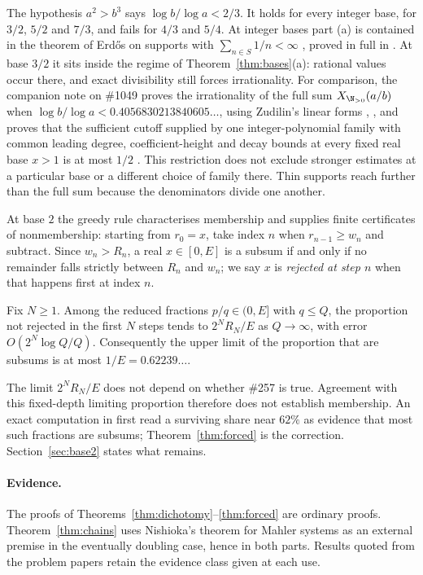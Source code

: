 \documentclass[11pt]{article}
\begin{document}
The hypothesis $a^2>b^3$ says $\log b/\log a<2/3$.  It holds for every integer
base, for $3/2$, $5/2$ and $7/3$, and fails for $4/3$ and $5/4$.  At integer
bases part (a) is contained in the theorem of Erd\H{o}s on supports with
$\sum_{n\in S}1/n<\infty$ \cite{erdos1968}, proved in full in
\cite[Theorem~2]{plectis257}.  At base $3/2$ it sits inside the regime of
Theorem~\ref{thm:bases}(a): rational values occur there, and exact divisibility
still forces irrationality.  For comparison, the companion note on \#1049 proves the irrationality of the
full sum $X_{\N_{>0}}(a/b)$ when $\log b/\log a<0.4056830213840605\ldots$, using Zudilin's
linear forms \cite[Theorem~1]{plectis1049}, \cite{zudilin2004}, and proves that
the sufficient cutoff supplied by one integer-polynomial family with common
leading degree, coefficient-height and decay bounds at every fixed real base
$x>1$ is at most $1/2$ \cite[Theorem~5]{plectis1049}.  This restriction does not
exclude stronger estimates at a particular base or a different choice of
family there.  Thin supports reach further than the full sum
because the denominators divide one another.

At base $2$ the greedy rule characterises membership and supplies finite
certificates of nonmembership: starting from $r_0=x$, take
index $n$ when $r_{n-1}\ge w_n$ and subtract.  Since $w_n>R_n$, a real
$x\in[0,E]$ is a subsum if and only if no remainder falls strictly between
$R_n$ and $w_n$; we say $x$ is \emph{rejected at step $n$} when that happens
first at index $n$.

\begin{theorem}\label{thm:forced}
Fix $N\ge1$.  Among the reduced fractions $p/q\in(0,E]$ with $q\le Q$, the
proportion not rejected in the first $N$ steps tends to $2^NR_N/E$ as
$Q\to\infty$, with error $O(2^N\log Q/Q)$.  Consequently the upper limit of
the proportion that are subsums is at most $1/E=0.62239\ldots$.
\end{theorem}

The limit $2^NR_N/E$ does not depend on whether \#257 is true.  Agreement with
this fixed-depth limiting proportion therefore does not establish membership.
An exact computation in \cite{plectisinvestigation} first read a surviving
share near $62\%$ as evidence that most such fractions are subsums;
Theorem~\ref{thm:forced} is the correction.  Section~\ref{sec:base2} states
what remains.

\paragraph{Evidence.} The proofs of Theorems~\ref{thm:dichotomy}--\ref{thm:forced}
are ordinary proofs. Theorem~\ref{thm:chains} uses Nishioka's theorem for
Mahler systems as an external premise in the eventually doubling case, hence
in both parts. Results quoted from the problem papers retain the evidence
class given at each use.
\end{document}

